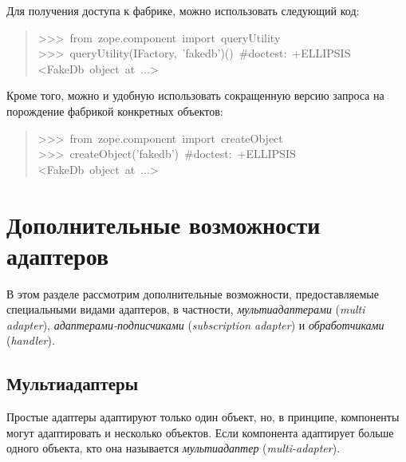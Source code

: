 \documentclass[a4paper,openany,twoside,final]{book}
\providecommand*{\DUroletitlereference}[1]{\textsl{#1}}
\begin{document}
Для получения доступа к фабрике, можно использовать следующий код:

\begin{quote}{\ttfamily \raggedright \noindent
>{}>{}>~from~zope.component~import~queryUtility\\
>{}>{}>~queryUtility(IFactory,~'fakedb')()~\#doctest:~+ELLIPSIS\\
<FakeDb~object~at~...>
}
\end{quote}

Кроме того, можно и удобную использовать сокращенную версию запроса на
порождение фабрикой конкретных объектов:

\begin{quote}{\ttfamily \raggedright \noindent
>{}>{}>~from~zope.component~import~createObject\\
>{}>{}>~createObject('fakedb')~\#doctest:~+ELLIPSIS\\
<FakeDb~object~at~...>
}
\end{quote}


\chapter{Дополнительные возможности адаптеров%
  \label{id44}%
}

В этом разделе рассмотрим дополнительные возможности, предоставляемые
специальными видами адаптеров, в частности, \DUroletitlereference{мультиадаптерами} (\DUroletitlereference{multi
adapter}), \DUroletitlereference{адаптерами-подписчиками} (\DUroletitlereference{subscription adapter}) и
\DUroletitlereference{обработчиками} (\DUroletitlereference{handler}).


\section{Мультиадаптеры%
  \label{id45}%
}

Простые адаптеры адаптируют только один объект, но, в принципе,
компоненты могут адаптировать и несколько объектов.  Если компонента
адаптирует больше одного объекта, кто она называется \DUroletitlereference{мультиадаптер}
(\DUroletitlereference{multi-adapter}).
\end{document}
